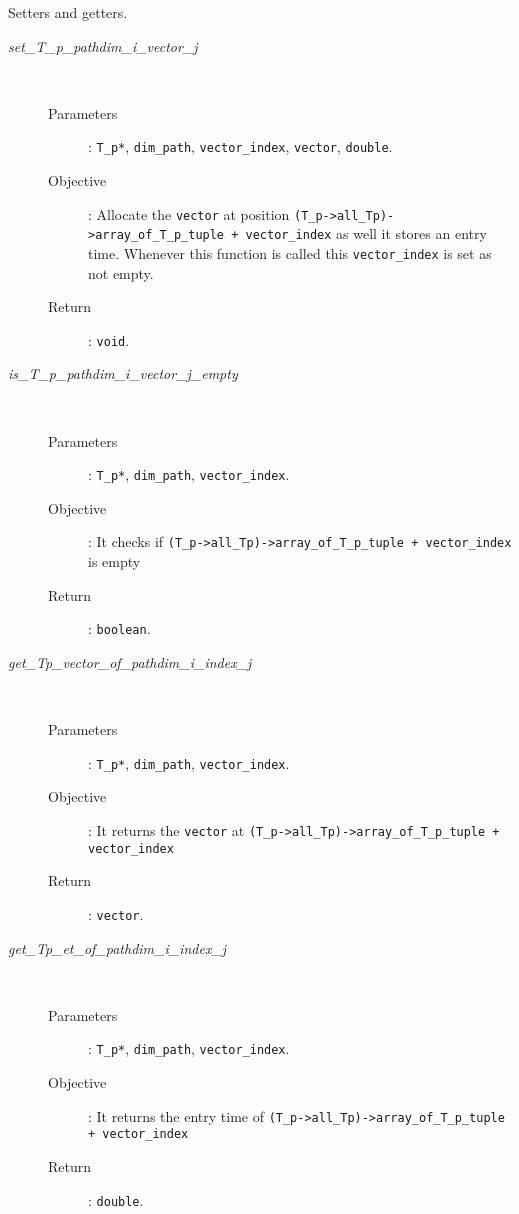 \documentclass[11pt,a4paper]{article}
\begin{document}
Setters and getters.
\begin{description}
	\item [\textit{set\_T\_p\_pathdim\_i\_vector\_j}] \hfill \\[-0.5cm]
		\begin{description}
			\item [Parameters]: \texttt{T\_p*}, \texttt{dim\_path}, \texttt{vector\_index},
				\texttt{vector}, \texttt{double}.
			\item [Objective]: Allocate the \texttt{vector} at position 
				\texttt{(T\_p->all\_Tp)->array\_of\_T\_p\_tuple + vector\_index}
				as well it stores an entry time. Whenever this function
				is called this \texttt{vector\_index} is set as not empty.
			\item [Return]: \texttt{void}.
		\end{description}

	\item [\textit{is\_T\_p\_pathdim\_i\_vector\_j\_empty}] \hfill \\[-0.5cm]
		\begin{description}
			\item [Parameters]: \texttt{T\_p*}, \texttt{dim\_path}, \texttt{vector\_index}.
			\item [Objective]: It checks if
				\texttt{(T\_p->all\_Tp)->array\_of\_T\_p\_tuple + vector\_index}
				is empty
			\item [Return]: \texttt{boolean}.
		\end{description}

	\item [\textit{get\_Tp\_vector\_of\_pathdim\_i\_index\_j}] \hfill \\[-0.5cm]
		\begin{description}
			\item [Parameters]: \texttt{T\_p*}, \texttt{dim\_path}, \texttt{vector\_index}.
			\item [Objective]: It returns the \texttt{vector} at
				\texttt{(T\_p->all\_Tp)->array\_of\_T\_p\_tuple + vector\_index}
			\item [Return]: \texttt{vector}.
		\end{description}

	\item [\textit{get\_Tp\_et\_of\_pathdim\_i\_index\_j}] \hfill \\[-0.5cm]
		\begin{description}
			\item [Parameters]: \texttt{T\_p*}, \texttt{dim\_path}, \texttt{vector\_index}.
			\item [Objective]: It returns the entry time of
				\texttt{(T\_p->all\_Tp)->array\_of\_T\_p\_tuple + vector\_index}
			\item [Return]: \texttt{double}.
		\end{description}
\end{description}



\end{document}
